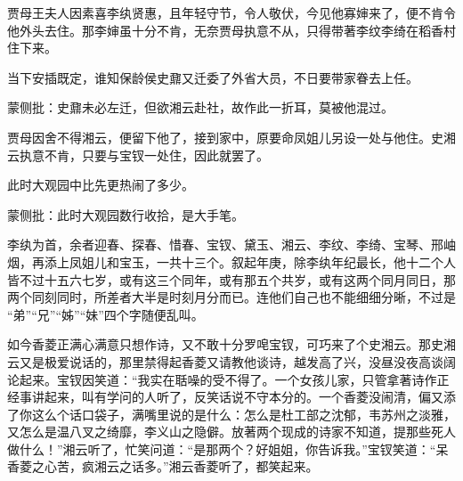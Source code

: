 \begin{parag}


    贾母王夫人因素喜李纨贤惠，且年轻守节，令人敬伏，今见他寡婶来了，便不肯令他外头去住。那李婶虽十分不肯，无奈贾母执意不从，只得带著李纹李绮在稻香村住下来。
\end{parag}


\begin{parag}


    当下安插既定，谁知保龄侯史鼐又迁委了外省大员，不日要带家眷去上任。\begin{note}蒙侧批：史鼐未必左迁，但欲湘云赴社，故作此一折耳，莫被他混过。\end{note}贾母因舍不得湘云，便留下他了，接到家中，原要命凤姐儿另设一处与他住。史湘云执意不肯，只要与宝钗一处住，因此就罢了。
\end{parag}


\begin{parag}


    此时大观园中比先更热闹了多少。\begin{note}蒙侧批：此时大观园数行收拾，是大手笔。\end{note}李纨为首，余者迎春、探春、惜春、宝钗、黛玉、湘云、李纹、李绮、宝琴、邢岫烟，再添上凤姐儿和宝玉，一共十三个。叙起年庚，除李纨年纪最长，他十二个人皆不过十五六七岁，或有这三个同年，或有那五个共岁，或有这两个同月同日，那两个同刻同时，所差者大半是时刻月分而已。连他们自己也不能细细分晰，不过是 “弟”“兄”“姊”“妹”四个字随便乱叫。
\end{parag}


\begin{parag}


    如今香菱正满心满意只想作诗，又不敢十分罗唣宝钗，可巧来了个史湘云。那史湘云又是极爱说话的，那里禁得起香菱又请教他谈诗，越发高了兴，没昼没夜高谈阔论起来。宝钗因笑道：“我实在聒噪的受不得了。一个女孩儿家，只管拿著诗作正经事讲起来，叫有学问的人听了，反笑话说不守本分的。一个香菱没闹清，偏又添了你这么个话口袋子，满嘴里说的是什么：怎么是杜工部之沈郁，韦苏州之淡雅，又怎么是温八叉之绮靡，李义山之隐僻。放著两个现成的诗家不知道，提那些死人做什么！”湘云听了，忙笑问道：“是那两个？好姐姐，你告诉我。”宝钗笑道：“呆香菱之心苦，疯湘云之话多。”湘云香菱听了，都笑起来。
\end{parag}


